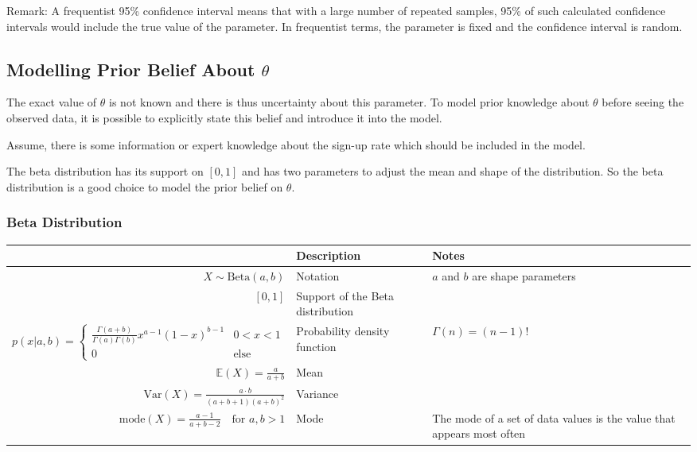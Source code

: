 \documentclass[11pt]{article}
\begin{document}
Remark: A frequentist 95\% confidence interval means that with a large number of repeated samples, 95\% of such calculated confidence intervals would include the true value of the parameter. In frequentist terms, the parameter is fixed and the confidence interval is random.

\subsection{Modelling Prior Belief About $\theta$}

The exact value of $\theta$ is not known and there is thus uncertainty about this parameter. To model prior knowledge about $\theta$ before seeing the observed data, it is possible to explicitly state this belief and introduce it into the model.

Assume, there is some information or expert knowledge about the sign-up rate which should be included in the model.

The beta distribution has its support on $[0,1]$ and has two parameters to adjust the mean and shape of the distribution. So the beta distribution is a good choice to model the prior belief on $\theta$.

\subsubsection{Beta Distribution}
\begin{minipage}{\textwidth}
	\renewcommand{\arraystretch}{1.5}
	\centering
	\begin{tabularx}{\textwidth}{r X X}
		\hline
		& \textbf{Description} & \textbf{Notes}\\
		\hline
		$ X \sim \text{Beta}(a,b)$ & Notation & $a$ and $b$ are shape parameters\\
		$[0,1]$ & Support of the Beta distribution & \\
		$ p(x|a,b) = \left\{ \begin{matrix}
		\frac{\Gamma(a+b)}{\Gamma(a)\Gamma(b)} x^{a-1}(1-x)^{b-1} &0<x<1\\
		0 & \text{else}
		\end{matrix} \right. $ & Probability density function & $\Gamma(n) = (n-1)!$\\
		$\mathbb{E}(X) = \frac{a}{a+b}$ & Mean & \\
		$\text{Var}(X) = \frac{a\cdot b}{(a+b+1)(a+b)^2}$ & Variance & \\
		$\text{mode}(X) = \frac{a-1}{a+b-2} \quad\text{for }a,b>1$ & Mode & The mode of a set of data values is the value that appears most often\\
	\end{tabularx}
\end{minipage}
\end{document}
